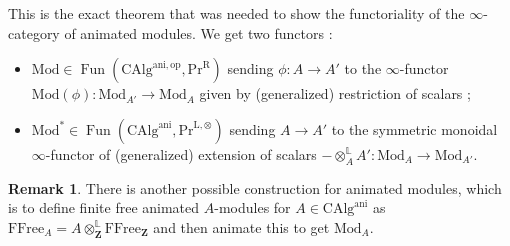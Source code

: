 \documentclass[11pt]{article}
\theoremstyle{definition}
\newtheorem{remark}[theorem]{Remark}
\newcommand{\ani}{\mathrm{ani}}
\newcommand{\CAlg}{\mathrm{CAlg}}
\newcommand{\FFree}{\mathrm{FFree}}
\newcommand{\Fun}{\operatorname{Fun}}
\renewcommand{\L}{\mathbb{L}}
\newcommand{\Mod}{\mathrm{Mod}}
\newcommand{\op}{\mathrm{op}}
\newcommand{\PrR}{\mathrm{Pr}^{\mathrm{R}}}
\newcommand{\Z}{\mathbf{Z}}
\begin{document}
This is the exact theorem that was needed to show the functoriality of the $\infty$-category of animated modules.
We get two functors :
\begin{itemize}
    \item $\Mod \in \Fun(\CAlg^{\ani, \op}, \PrR)$ sending $\phi : A \to A'$ to the $\infty$-functor $\Mod(\phi) : \Mod_{A'} \to \Mod_A$ given by (generalized) restriction of scalars ;
    \item $\Mod^* \in \Fun(\CAlg^{\ani}, \mathrm{Pr}^{\mathrm{L}, \otimes})$ sending $A \to A'$ to the symmetric monoidal $\infty$-functor of (generalized) extension of scalars $- \otimes_A^{\L} A' : \Mod_A \to \Mod_{A'}$.
\end{itemize}

\begin{remark}
    There is another possible construction for animated modules, which is to define finite free animated $A$-modules for $A \in \CAlg^{\ani}$ as $\FFree_A = A \otimes_{\Z}^{\L} \FFree_{\Z}$
    and then animate this to get $\Mod_A$.
\end{remark}
\end{document}
